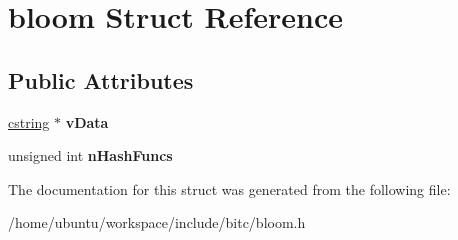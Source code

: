 \hypertarget{structbloom}{\section{bloom Struct Reference}
\label{structbloom}
}
\subsection*{Public Attributes}
\begin{DoxyCompactItemize}
\item 
\hypertarget{structbloom_a910b3bf3cdae4ae041d04d0ce4039f83}{\hyperlink{structcstring}{cstring} $\ast$ {\bfseries v\-Data}}\label{structbloom_a910b3bf3cdae4ae041d04d0ce4039f83}

\item 
\hypertarget{structbloom_ab7b9b4ddbdacaad087cb90157c60efdd}{unsigned int {\bfseries n\-Hash\-Funcs}}\label{structbloom_ab7b9b4ddbdacaad087cb90157c60efdd}

\end{DoxyCompactItemize}


The documentation for this struct was generated from the following file\-:\begin{DoxyCompactItemize}
\item 
/home/ubuntu/workspace/include/bitc/bloom.\-h\end{DoxyCompactItemize}
